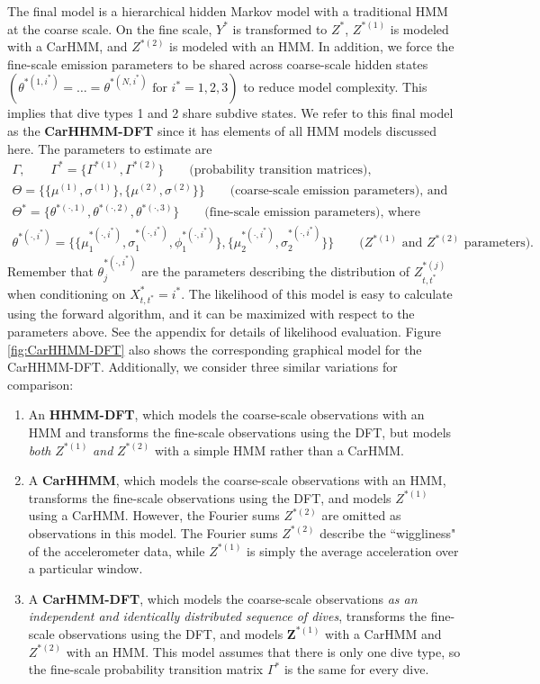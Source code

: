 The final model is a hierarchical hidden Markov model with a traditional HMM at the coarse scale. On the fine scale, $Y^*$ is transformed to $Z^*$, $Z^{*(1)}$ is modeled with a CarHMM, and $Z^{*(2)}$ is modeled with an HMM. In addition, we force the fine-scale emission parameters to be shared across coarse-scale hidden states $\left(\theta^{*(1,i^*)} = \ldots = \theta^{*(N,i^*)} \text{ for } i^* = 1,2,3\right)$ to reduce model complexity. This implies that dive types 1 and 2 share subdive states. We refer to this final model as the \textbf{CarHHMM-DFT} since it has elements of all HMM models discussed here. The parameters to estimate are
%
\begin{gather*}
    \Gamma, \qquad \Gamma^{*} = \{\Gamma^{*(1)},\Gamma^{*(2)}\} \qquad \text{(probability transition matrices)}, \\
    \Theta = \{\{\mu^{(1)},\sigma^{(1)}\},\{\mu^{(2)},\sigma^{(2)}\}\} \qquad \text{(coarse-scale emission parameters), and} \\
    \Theta^* = \{\theta^{*(\cdot,1)},\theta^{*(\cdot,2)},\theta^{*(\cdot,3)}\}  \qquad \text{(fine-scale emission parameters), where} \\
    \theta^{*(\cdot,i^*)} =  \{\{\mu_1^{*(\cdot,i^*)},\sigma_1^{*(\cdot,i^*)},\phi_1^{*(\cdot,i^*)}\},\{\mu_2^{*(\cdot,i^*)},\sigma_2^{*(\cdot,i^*)}\}\} \qquad \text{(}Z^{*(1)} \text{ and } Z^{*(2)} \text{ parameters).}
\end{gather*}
%
Remember that $\theta_j^{*(\cdot,i^*)}$ are the parameters describing the distribution of $Z^{*(j)}_{t,t^*}$ when conditioning on $X^*_{t,t^*} = i^*$. The likelihood of this model is easy to calculate using the forward algorithm, and it can be maximized with respect to the parameters above. See the appendix for details of likelihood evaluation. Figure \ref{fig:CarHHMM-DFT} also shows the corresponding graphical model for the CarHHMM-DFT. Additionally, we consider three similar variations for comparison:
\begin{enumerate}
    \item An \textbf{HHMM-DFT}, which models the coarse-scale observations with an HMM and transforms the fine-scale observations using the DFT, but models \textit{both} $Z^{*(1)}$ \textit{and} $Z^{*(2)}$ with a simple HMM rather than a CarHMM.
    \item A \textbf{CarHHMM}, which models the coarse-scale observations with an HMM, transforms the fine-scale observations using the DFT, and models $Z^{*(1)}$ using a CarHMM. However, the Fourier sums $Z^{*(2)}$ are omitted as observations in this model. The Fourier sums $Z^{*(2)}$ describe the ``wiggliness" of the accelerometer data, while $Z^{*(1)}$ is simply the average acceleration over a particular window.
    \item A \textbf{CarHMM-DFT}, which models the coarse-scale observations \textit{as an independent and identically distributed sequence of dives}, transforms the fine-scale observations using the DFT, and models $\mathbf{Z}^{*(1)}$ with a CarHMM and $Z^{*(2)}$ with an HMM. This model assumes that there is only one dive type, so the fine-scale probability transition matrix $\Gamma^*$ is the same for every dive. 
\end{enumerate}
